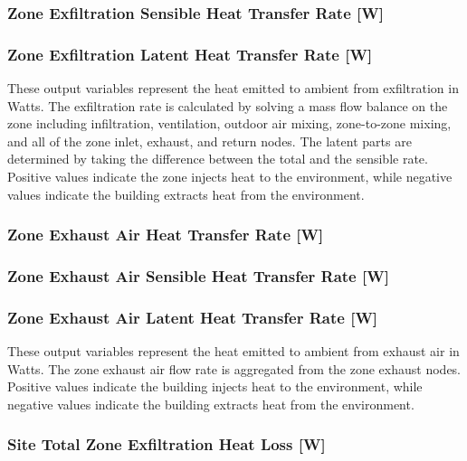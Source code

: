 \subsubsection{Zone Exfiltration Sensible Heat Transfer Rate {[}W{]}}\label{zone-exfiltration-sensible-heat-transfer-rate-w}

\subsubsection{Zone Exfiltration Latent Heat Transfer Rate {[}W{]}}\label{zone-exfiltration-latent-heat-transfer-rate-w}

These output variables represent the heat emitted to ambient from exfiltration in Watts. The exfiltration rate is calculated by solving a mass flow balance on the zone including infiltration, ventilation, outdoor air mixing, zone-to-zone mixing, and all of the zone inlet, exhaust, and return nodes. The latent parts are determined by taking the difference between the total and the sensible rate. Positive values indicate the zone injects heat to the environment, while negative values indicate the building extracts heat from the environment. 

\subsubsection{Zone Exhaust Air Heat Transfer Rate {[}W{]}}\label{zone-exhaust-heat-transfer-rate-w}

\subsubsection{Zone Exhaust Air Sensible Heat Transfer Rate {[}W{]}}\label{zone-exhaust-sensible-heat-transfer-rate-w}

\subsubsection{Zone Exhaust Air Latent Heat Transfer Rate {[}W{]}}\label{zone-exhaust-latent-heat-transfer-rate-w}

These output variables represent the heat emitted to ambient from exhaust air in Watts. The zone exhaust air flow rate is aggregated from the zone exhaust nodes. Positive values indicate the building injects heat to the environment, while negative values indicate the building extracts heat from the environment. 

\subsubsection{Site Total Zone Exfiltration Heat Loss {[}W{]}}\label{site-total-exfiltration-heat-transfer-rate-w}

